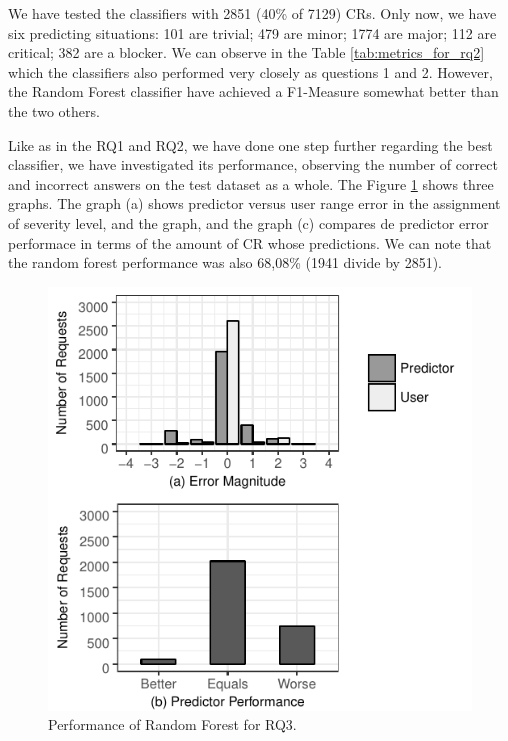 \documentclass[10pt, conference]{IEEEtran}
\begin{document}
We have tested the classifiers with 2851 (40\% of 7129) CRs. Only now, we have six predicting situations: 101 are trivial; 479 are minor; 1774 are major; 112 are critical; 382 are a blocker. We can observe in the Table \ref{tab:metrics_for_rq2} which the classifiers also performed very closely as questions 1 and 2. However, the Random Forest classifier have achieved a F1-Measure somewhat better than the two others. 

Like as in the RQ1 and RQ2, we have done one step further regarding the best classifier, we have investigated its performance, observing the number of correct and incorrect answers on the test dataset as a whole. The Figure \ref{fig:rf_performance_for_q3} shows three graphs. The graph (a) shows predictor versus user range error in the assignment of severity level, and the graph, and the graph (c) compares de predictor error performace in terms of the amount of CR whose predictions. We can note that the random forest performance was also 68,08\% (1941 divide by 2851). 


\begin{figure}[!ht]

  \includegraphics{figures/rf_performance_for_q3.pdf}
  \caption{Performance of Random Forest for RQ3.}
    \label{fig:rf_performance_for_q3}
\end{figure}
\end{document}

